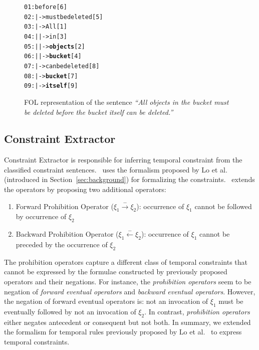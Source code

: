\begin{figure}
	\begin{CodeOut}
		\begin{alltt}
			01:before[6]
			02:|->must be deleted[5]
			03:\hspace*{0.2in}|->All[1]
			04:\hspace*{0.2in}|\hspace*{0.2in}|->in[3]
			05:\hspace*{0.2in}|\hspace*{0.4in}|->\textbf{objects}[2]
			06:\hspace*{0.2in}|\hspace*{0.4in}|->\textbf{bucket}[4]
			07:\hspace*{0.2in}|->can be deleted[8]
			08:\hspace*{0.4in}|->\textbf{bucket}[7]
			09:\hspace*{0.4in}|->\textbf{itself}[9]
		\end{alltt}
	\end{CodeOut}
	\caption{\label{fig:FOLTree} FOL representation of the sentence \textit{``All objects in the bucket must be deleted before the bucket itself can be deleted.''}}
\end{figure}

\subsection{Constraint Extractor}
\label{sub:SE}

Constraint Extractor is responsible for inferring temporal constraint from the classified constraint sentences.
\tool\ uses the formalism proposed by Lo et al.~\cite{lo2009mining} (introduced in Section~\ref{sec:background})
for formalizing the constraints. 
\tool\ extends the operators by proposing two additional operators:

\begin{enumerate}
	\item Forward Prohibition Operator ($\xi_1 \xrightarrow{-} \xi_2$):
	occurrence of $\xi_1$ cannot be followed by occurrence of $\xi_2$
	
	\item Backward Prohibition Operator ($\xi_1 \xleftarrow{-} \xi_2$):
	occurrence of $\xi_1$ cannot be preceded by the occurrence of $\xi_2$
\end{enumerate}

The prohibition operators capture a different class of temporal constraints that cannot be
expressed by the formulae constructed by previously proposed operators and their negations.
For instance, the \textit{prohibition operators} seem to be negation of
\textit{forward eventual operators} and \textit{backward eventual operators}.
However, the negation of forward eventual operators is: not an invocation of $\xi_1$
must be eventually followed by not an invocation of $\xi_2$. In contrast,
\textit{prohibition operators} either negates antecedent or consequent but not both.
In summary, we extended the formalism for temporal rules previously
proposed by Lo et al.~\cite{lo2009mining} to express temporal constraints.

